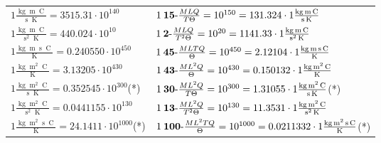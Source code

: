 \begin{center}
\begin{longtable}{l l}
{\color{black}$1 \bm{\mathrm{ }}\frac{\operatorname{kg}\operatorname{m}\operatorname{C}}{\operatorname{s}\operatorname{K}} = 3515.31\cdot10^{140} $}&
	{\color{black}$1\:\text{\textbf{15}-} \frac{MLQ}{T\Theta}=10^{150} = 131.324 \cdot 1 \bm{\mathrm{ }}\frac{\operatorname{kg}\operatorname{m}\operatorname{C}}{\operatorname{s}\operatorname{K}}$}\\
{\color{black}$1 \bm{\mathrm{ }}\frac{\operatorname{kg}\operatorname{m}\operatorname{C}}{\operatorname{s}^2\operatorname{K}} = 440.024\cdot10^{10} $}&
	{\color{black}$1\:\text{\textbf{2}-} \frac{MLQ}{T^2\Theta}=10^{20} = 1141.33 \cdot 1 \bm{\mathrm{ }}\frac{\operatorname{kg}\operatorname{m}\operatorname{C}}{\operatorname{s}^2\operatorname{K}}$}\\
{\color{black}$1 \bm{\mathrm{ }}\frac{\operatorname{kg}\operatorname{m}\operatorname{s}\operatorname{C}}{\operatorname{K}} = 0.240550\cdot10^{450} $}&
	{\color{black}$1\:\text{\textbf{45}-} \frac{MLTQ}{\Theta}=10^{450} = 2.12104 \cdot 1 \bm{\mathrm{ }}\frac{\operatorname{kg}\operatorname{m}\operatorname{s}\operatorname{C}}{\operatorname{K}}$}\\
{\color{black}$1 \bm{\mathrm{ }}\frac{\operatorname{kg}\operatorname{m}^2\operatorname{C}}{\operatorname{K}} = 3.13205\cdot10^{430} $}&
	{\color{black}$1\:\text{\textbf{43}-} \frac{ML^2Q}{\Theta}=10^{430} = 0.150132 \cdot 1 \bm{\mathrm{ }}\frac{\operatorname{kg}\operatorname{m}^2\operatorname{C}}{\operatorname{K}}$}\\
{\color{black}$1 \bm{\mathrm{ }}\frac{\operatorname{kg}\operatorname{m}^2\operatorname{C}}{\operatorname{s}\operatorname{K}} = 0.352545\cdot10^{300} $}\quad(*)&
	{\color{black}$1\:\text{\textbf{30}-} \frac{ML^2Q}{T\Theta}=10^{300} = 1.31055 \cdot 1 \bm{\mathrm{ }}\frac{\operatorname{kg}\operatorname{m}^2\operatorname{C}}{\operatorname{s}\operatorname{K}}$}\quad(*)\\
{\color{black}$1 \bm{\mathrm{ }}\frac{\operatorname{kg}\operatorname{m}^2\operatorname{C}}{\operatorname{s}^2\operatorname{K}} = 0.0441155\cdot10^{130} $}&
	{\color{black}$1\:\text{\textbf{13}-} \frac{ML^2Q}{T^2\Theta}=10^{130} = 11.3531 \cdot 1 \bm{\mathrm{ }}\frac{\operatorname{kg}\operatorname{m}^2\operatorname{C}}{\operatorname{s}^2\operatorname{K}}$}\\
{\color{black}$1 \bm{\mathrm{ }}\frac{\operatorname{kg}\operatorname{m}^2\operatorname{s}\operatorname{C}}{\operatorname{K}} = 24.1411\cdot10^{1000} $}\quad(*)&
	{\color{black}$1\:\text{\textbf{100}-} \frac{ML^2TQ}{\Theta}=10^{1000} = 0.0211332 \cdot 1 \bm{\mathrm{ }}\frac{\operatorname{kg}\operatorname{m}^2\operatorname{s}\operatorname{C}}{\operatorname{K}}$}\quad(*)\\

\end{longtable}
\end{center}
